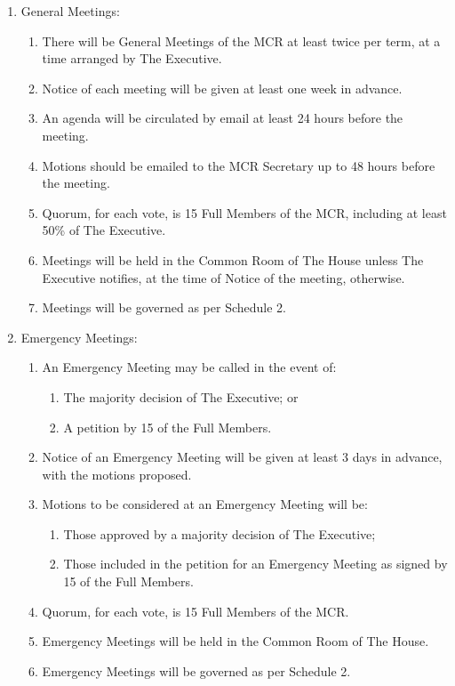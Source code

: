 \documentclass[11pt, a4paper]{article}
\begin{document}
\begin{enumerate}
    \item General Meetings:
    \begin{enumerate}
        \item There will be General Meetings of the MCR at least twice per term, at a time arranged by The Executive.
        \item Notice of each meeting will be given at least one week in advance.
        \item An agenda will be circulated by email at least 24 hours before the meeting.
        \item Motions should be emailed to the MCR Secretary up to 48 hours before the meeting.
        \item Quorum, for each vote, is 15 Full Members of the MCR, including at least 50\% of The Executive.
        \item Meetings will be held in the Common Room of The House unless The Executive notifies, at the time of Notice of the meeting, otherwise.
        \item Meetings will be governed as per Schedule 2.
    \end{enumerate}
    \item Emergency Meetings:
    \begin{enumerate}
        \item An Emergency Meeting may be called in the event of:
        \begin{enumerate}
            \item The majority decision of The Executive; or
            \item A petition by 15 of the Full Members.
        \end{enumerate}
        \item Notice of an Emergency Meeting will be given at least 3 days in advance, with the motions proposed.
        \item Motions to be considered at an Emergency Meeting will be:
        \begin{enumerate}
            \item Those approved by a majority decision of The Executive;
            \item Those included in the petition for an Emergency Meeting as signed by 15 of the Full Members.
        \end{enumerate}
        \item Quorum, for each vote, is 15 Full Members of the MCR.
        \item Emergency Meetings will be held in the Common Room of The House.
        \item Emergency Meetings will be governed as per Schedule 2.
    \end{enumerate}
\end{enumerate}
\end{document}
